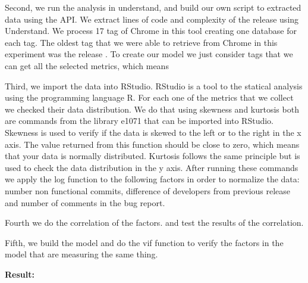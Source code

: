 Second, we run the analysis in understand, and build our own script to extracted data using the API. We extract lines of code and complexity of the release using Understand. We process 17 tag of Chrome in this tool creating one database for each tag. The oldest tag that we were able to retrieve from Chrome in this experiment was the release . To create our model we just consider tags that we can get all the selected metrics, which means 

Third, we import the data into RStudio. RStudio is a tool to the statical analysis using the programming language R. For each one of the metrics that we collect we checked their data distribution. We do that using skewness and kurtosis both are commands from the library e1071 that can be imported into RStudio. Skewness is used to verify if the data is skewed to the left or to the right in the x axis. The value returned from this function should be close to zero, which means that your data is normally distributed. Kurtosis follows the same principle but is used to check the data distribution in the y axis. After running these commands we apply the log function to the following factors in order to normalize the data: number non functional commits, difference of developers from previous release and number of comments in the bug report. 

Fourth we do the correlation of the factors. and test the results of the correlation.

Fifth, we build the model and do the vif function to verify the factors in the model that are measuring the same thing. 
 
\vspace{1mm}
\noindent\textbf{Result:}


